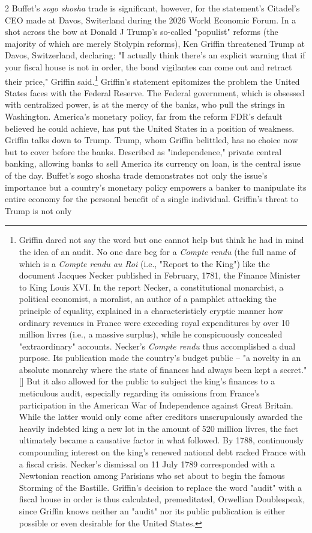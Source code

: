 \documentclass[10pt,a4paper,twoside]{article} %
\begin{document}
\begin{multicols}{2}
{{\newline \indent Buffet's \emph{sogo shosha} trade is significant, however, for the statement's Citadel's CEO made at Davos, Switerland during the 2026 World Economic Forum. In a shot across the bow at Donald J Trump's so-called "populist" reforms (the majority of which are merely Stolypin reforms), Ken Griffin threatened Trump at Davos, Switzerland, declaring: "I actually think there's an explicit warning that if your fiscal house is not in order, the bond vigilantes can come out and retract their price," Griffin said.\footnote{Griffin dared not say the word but one cannot help but think he had in mind the idea of an audit.  No one dare beg for a \emph{Compte rendu} (the full name of which is a \emph{Compte rendu au Roi} (i.e., "Report to the King") like the document Jacques Necker published in February, 1781, the Finance Minister to King Louis XVI. In the report Necker, a constitutional monarchist, a political economist, a moralist, an author of a pamphlet attacking the principle of equality, explained in a characteristicly cryptic manner how ordinary revenues in France were exceeding royal expenditures by over 10 million livres (i.e., a massive surplus), while he conspicuously concealed "extraordinary" accounts. Necker's \emph{Compte rendu} thus accomplished a dual purpose. Its publication made the country's budget public – "a novelty in an absolute monarchy where the state of finances had always been kept a secret."[] But it also allowed for the public to subject the king's finances to a meticulous audit, especially regarding its omissions from France's participation in the American War of Independence against Great Britain. While the latter would only come after creditors unscrupulously awarded the heavily indebted king a new lot in the amount of 520 million livres, the fact ultimately became a causative factor in what followed. By 1788, continuously compounding interest on the king's renewed national debt racked France with a fiscal crisis. Necker's dismissal on 11 July 1789 corresponded with a Newtonian reaction among Parisians who set about to begin the famous Storming of the Bastille. Griffin's decision to replace the word "audit" with a fiscal house in order is thus calculated, premeditated, Orwellian Doublespeak, since Griffin knows neither an "audit" nor its public publication is either possible or even desirable for the United States.} Griffin's statement epitomizes the problem the United States faces with the Federal Reserve. The Federal government, which is obsessed with centralized power, is at the mercy of the banks, who pull the strings in Washington. America's monetary policy, far from the reform FDR's default believed he could achieve, has put the United States in a position of weakness. Griffin talks down to Trump. Trump, whom Griffin belittled, has no choice now but to cover before the banks. Described as "independence," private central banking, allowing banks to sell America its currency on loan, is the central issue of the day.  Buffet's sogo shosha trade demonstrates not only the issue's importance but a country's monetary policy empowers a banker to manipulate its entire economy for the personal benefit of a single individual. Griffin's threat to Trump is not only }}
\end{multicols}
\end{document}
